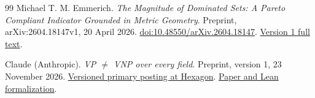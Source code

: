\documentclass[12pt,a4paper]{article}
\theoremstyle{definition}
\theoremstyle{remark}
\begin{document}
\begin{thebibliography}{99}
Michael T. M. Emmerich.
\emph{The Magnitude of Dominated Sets: A Pareto Compliant Indicator
Grounded in Metric Geometry}.
Preprint, arXiv:2604.18147v1, 20 April 2026.
\href{https://doi.org/10.48550/arXiv.2604.18147}{doi:10.48550/arXiv.2604.18147}.
\href{https://arxiv.org/html/2604.18147v1}{Version 1 full text}.

Claude (Anthropic).
\emph{VP $\ne$ VNP over every field}.
Preprint, version 1, 23 November 2026.
\href{https://hexagonmath.org/2611.00954v1}{Versioned primary posting at Hexagon}.
\href{https://github.com/anthropics/formal-math/tree/11b6c7e3c927df2658f513b6b68ea7f8929c62c5/vp-vnp}{Paper and Lean formalization}.

\end{thebibliography}
\end{document}
